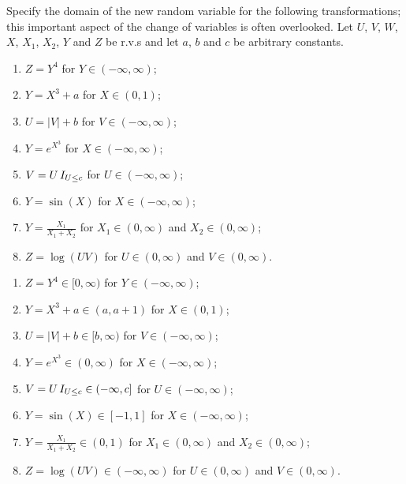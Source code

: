 \documentclass[assignments]{subfiles}
\begin{document}
\begin{exercise}
Specify the domain of the new random variable for the following transformations; this important aspect of the change of variables is often overlooked.
Let $U$, $V$, $W$, $X$, $X_1$, $X_2$, $Y$ and $Z$ be r.v.s and let $a$, $b$ and $c$ be arbitrary constants.
\begin{enumerate}
    \item $Z = Y^{4}$ for $Y \in (-\infty,\infty)$;
    \item $Y = X^{3}+a$ for $X \in (0,1)$;
    \item $U = |V|+b$ for $V \in (-\infty,\infty)$;
    \item $Y = e^{X^3}$ for $X \in (-\infty,\infty)$;
    \item $V = U \,I_{U \leq c}$ for $U \in (-\infty,\infty)$;
    \item $Y = \sin(X)$ for $X \in (-\infty,\infty)$;
    \item $Y = \frac{X_1}{X_1+X_2}$ for $X_1 \in (0,\infty)$ and $X_2 \in (0,\infty)$;
    \item $Z = \log(UV)$ for $U \in (0,\infty)$ and $V \in (0,\infty)$. \\
\end{enumerate}
\begin{solution}
\begin{enumerate}
    \item $Z = Y^{4} \in [0, \infty)$ for $Y \in (-\infty,\infty)$;
    \item $Y = X^{3}+a \in (a, a+1)$ for $X \in (0,1)$;
    \item $U = |V|+b \in [b, \infty)$ for $V \in (-\infty,\infty)$;
    \item $Y = e^{X^3} \in (0, \infty)$ for $X \in (-\infty,\infty)$;
    \item $V = U \,I_{U \leq c} \in (-\infty, c]$ for $U \in (-\infty,\infty)$;
    \item $Y = \sin(X) \in [-1, 1]$ for $X \in (-\infty,\infty)$;
    \item $Y = \frac{X_1}{X_1+X_2} \in (0, 1)$ for $X_1 \in (0,\infty)$ and $X_2 \in (0,\infty)$;
    \item $Z = \log(UV) \in (-\infty, \infty)$ for $U \in (0,\infty)$ and $V \in (0,\infty)$. \\
\end{enumerate}
\end{solution}

\end{exercise}
\end{document}
